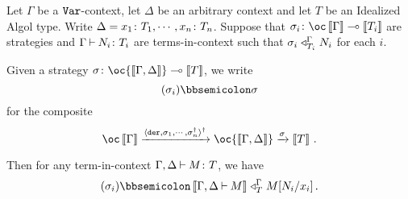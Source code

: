 \documentclass[11pt]{report}
\begin{document}
\begin{lemma}
  Let $\Gamma$ be a ${\mathtt{Var}}$-context, let $\Delta$ be an arbitrary context and let $T$ be an Idealized Algol type.
  Write $\Delta=x_1\colon T_1,\cdots,x_n\colon T_n$.  
  Suppose that $\sigma_i\from \oc\deno{\Gamma} \implies \deno{T_i}$ are strategies and $\Gamma\mathbin{\vdash} N_i\colon T_i$ are terms-in-context such that $\sigma_i\mathrel{\triangleleft}_{T_i}^\Gamma N_i$ for each $i$.  

  Given a strategy $\sigma\from \oc{\deno{\Gamma,\Delta}}\implies \deno{T}$, we write
  \[
    (\sigma_i)\semicom \sigma
    \]
  for the composite
  \[
    \oc\deno{\Gamma} \xrightarrow{\langle \der,\sigma_1,\cdots,\sigma_n^\dag\rangle^\dag} \oc{\deno{\Gamma,\Delta}} \xrightarrow{\sigma} \deno{T}\,.
    \]

  Then for any term-in-context $\Gamma,\Delta \mathbin{\vdash} M\colon T$, we have
  \[
    (\sigma_i)\semicom\deno{\Gamma,\Delta\ts M} \plot_T^{\Gamma} M[N_i/x_i]\,.
    \]
  \label{LemAdequacy}
\end{lemma}
\end{document}

